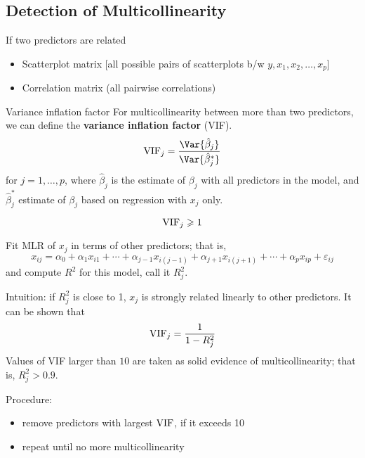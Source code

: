 \subsection{Detection of Multicollinearity}
If two predictors are related
\begin{itemize}
    \item Scatterplot matrix [all possible pairs of
                  scatterplots b/w $ y,x_1,x_2,\ldots,x_p $]
    \item Correlation matrix (all pairwise correlations)
\end{itemize}
\begin{Definition}{Variance inflation factor}{}
    For multicollinearity between more than two
    predictors, we can define the \textbf{variance inflation factor}
    (VIF).
    \[ \VIF_j=\frac{\Var{\hat{\beta}_j}}{\Var{\hat{\beta}_j^*}} \]
    for $ j=1,\ldots,p $,
    where $ \hat{\beta}_j $ is the estimate of $ \beta_j $ with all predictors
    in the model, and $ \hat{\beta}_j^* $ estimate
    of $ \beta_j $ based on regression with $ x_j $ only.
\end{Definition}
\begin{Theorem}{}{}
    \[ \operatorname{VIF}_j\geqslant 1 \]

\end{Theorem}
Fit MLR of $ x_j $ in terms of other predictors;
that is,
\[ x_{i j}=\alpha_0+\alpha_1x_{i1}+\cdots+\alpha_{j-1}x_{i(j-1)}+
    \alpha_{j+1}x_{i(j+1)}+\cdots+\alpha_p x_{i p}+\varepsilon_{ij} \]
and compute $ R^2 $ for this model, call it $ R_j^2 $.

Intuition: if $ R_j^2 $ is close to 1, $ x_j $ is strongly
related linearly to other predictors. It can be shown that
\[ \operatorname{VIF}_j=\frac{1}{1-R_j^2}  \]
Values of VIF
larger than $ 10 $ are taken as solid evidence of multicollinearity;
that is, $ R_j^2>0.9 $.

Procedure:
\begin{itemize}
    \item remove predictors with largest $ \operatorname{VIF} $, if it exceeds 10
    \item repeat until no more multicollinearity
\end{itemize}

